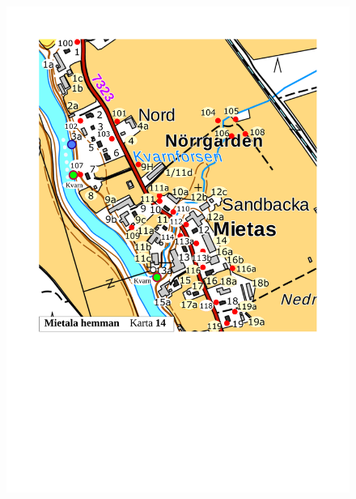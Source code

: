 \begin{figure}[htbp]
  \centering
  \includegraphics[width=1\textwidth]{kartor/Karta14.pdf}
  \label{map:14}
\end{figure}


